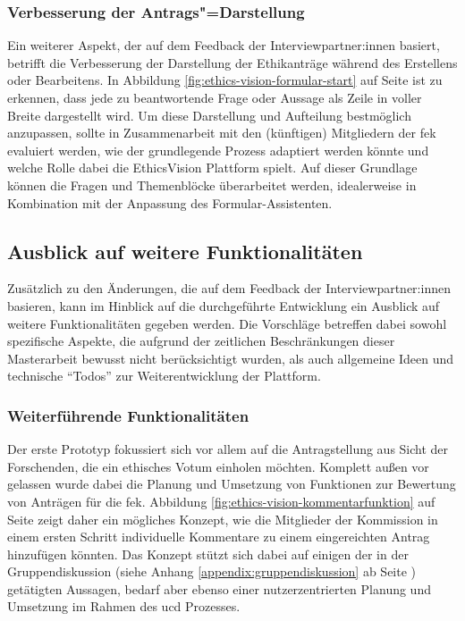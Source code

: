 \documentclass[a4paper,12pt,twoside,numbers=noendperiod]{scrreprt}
\begin{document}
\subsubsection*{Verbesserung der Antrags"=Darstellung}
\label{sub-sub-sec:verbesserung-antrags-darstellung}

Ein weiterer Aspekt, der auf dem Feedback der Interviewpartner:innen basiert, betrifft die Verbesserung der Darstellung der Ethikanträge während des Erstellens oder Bearbeitens. In Abbildung \ref{fig:ethics-vision-formular-start} auf Seite \pageref{fig:ethics-vision-formular-start} ist zu erkennen, dass jede zu beantwortende Frage oder Aussage als Zeile in voller Breite dargestellt wird. Um diese Darstellung und Aufteilung bestmöglich anzupassen, sollte in Zusammenarbeit mit den (künftigen) Mitgliedern der \ac{fek} evaluiert werden, wie der grundlegende Prozess adaptiert werden könnte und welche Rolle dabei die EthicsVision Plattform spielt. Auf dieser Grundlage können die Fragen und Themenblöcke überarbeitet werden, idealerweise in Kombination mit der Anpassung des Formular-Assistenten.

\subsection{Ausblick auf weitere Funktionalitäten}
\label{sub-sec:ausblick-weitere-funktionalitäten}

Zusätzlich zu den Änderungen, die auf dem Feedback der Interviewpartner:innen basieren, kann im Hinblick auf die durchgeführte Entwicklung ein Ausblick auf weitere Funktionalitäten gegeben werden. Die Vorschläge betreffen dabei sowohl spezifische Aspekte, die aufgrund der zeitlichen Beschränkungen dieser Masterarbeit bewusst nicht berücksichtigt wurden, als auch allgemeine Ideen und technische \enquote{Todos} zur Weiterentwicklung der Plattform.

\subsubsection*{Weiterführende Funktionalitäten}

Der erste Prototyp fokussiert sich vor allem auf die Antragstellung aus Sicht der Forschenden, die ein ethisches Votum einholen möchten. Komplett außen vor gelassen wurde dabei die Planung und Umsetzung von Funktionen zur Bewertung von Anträgen für die \acl{fek}. Abbildung \ref{fig:ethics-vision-kommentarfunktion} auf Seite \pageref{fig:ethics-vision-kommentarfunktion} zeigt daher ein mögliches Konzept, wie die Mitglieder der Kommission in einem ersten Schritt individuelle Kommentare zu einem eingereichten Antrag hinzufügen könnten. Das Konzept stützt sich dabei auf einigen der in der Gruppendiskussion (siehe Anhang \ref{appendix:gruppendiskussion} ab Seite \pageref{appendix:gruppendiskussion}) getätigten Aussagen, bedarf aber ebenso einer nutzerzentrierten Planung und Umsetzung im Rahmen des \ac{ucd} Prozesses.
\end{document}
